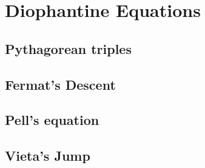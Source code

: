 \chapter{Diophantine Equations}

\section{Pythagorean triples}

\section{Fermat's Descent}

\section{Pell's equation}

\section{Vieta's Jump}
